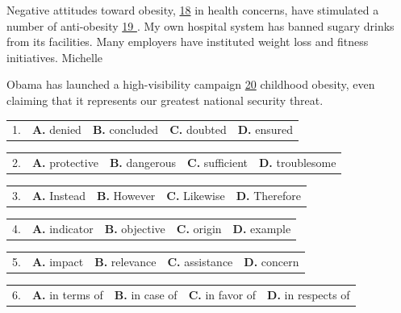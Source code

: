 \documentclass[UTF8,11pt]{ctexart}
\begin{document}
Negative attitudes toward obesity, \uline{18} in health concerns, have stimulated a number of anti-obesity \uline{19 }. My own hospital system has banned sugary drinks from its facilities. Many employers have instituted weight loss and fitness initiatives. Michelle


Obama has launched a high-visibility campaign \uline{20} childhood obesity, even claiming that it represents our greatest national security threat.


\noindent\begin{tabularx}{\linewidth}{@{}lXXXX@{}}1. & \textbf{A.} denied & \textbf{B.} concluded & \textbf{C.} doubted & \textbf{D.} ensured\\\end{tabularx}\par

\noindent\begin{tabularx}{\linewidth}{@{}lXXXX@{}}2. & \textbf{A.} protective & \textbf{B.} dangerous & \textbf{C.} sufficient & \textbf{D.} troublesome\\\end{tabularx}\par

\noindent\begin{tabularx}{\linewidth}{@{}lXXXX@{}}3. & \textbf{A.} Instead & \textbf{B.} However & \textbf{C.} Likewise & \textbf{D.} Therefore\\\end{tabularx}\par

\noindent\begin{tabularx}{\linewidth}{@{}lXXXX@{}}4. & \textbf{A.} indicator & \textbf{B.} objective & \textbf{C.} origin & \textbf{D.} example\\\end{tabularx}\par

\noindent\begin{tabularx}{\linewidth}{@{}lXXXX@{}}5. & \textbf{A.} impact & \textbf{B.} relevance & \textbf{C.} assistance & \textbf{D.} concern\\\end{tabularx}\par

\noindent\begin{tabularx}{\linewidth}{@{}lXXXX@{}}6. & \textbf{A.} in terms of & \textbf{B.} in case of & \textbf{C.} in favor of & \textbf{D.} in respects of\\\end{tabularx}\par
\end{document}
